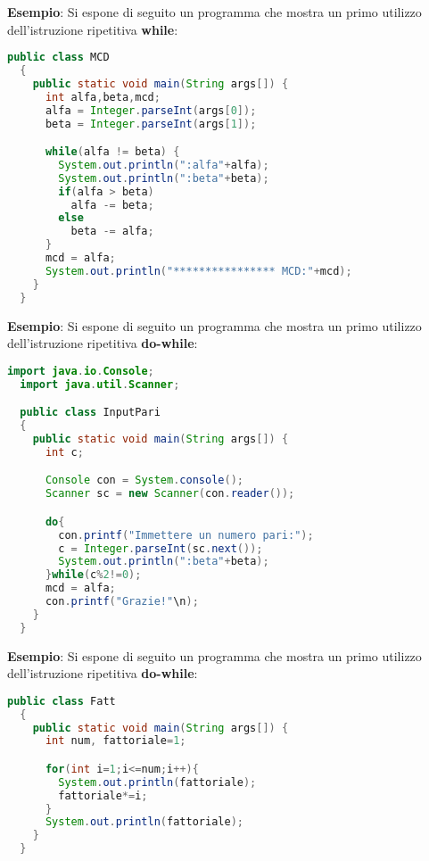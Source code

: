 \documentclass[a4paper]{extarticle}
\begin{document}
\vspace{0.5em}
\noindent
\textbf{Esempio}: Si espone di seguito un programma che mostra un primo utilizzo dell'istruzione ripetitiva \textbf{while}:

\vspace{1em}
\noindent
\begin{lstlisting}[language=Java, caption=Istruzione ripetitiva while in Java]
  public class MCD
  {
    public static void main(String args[]) {
      int alfa,beta,mcd;
      alfa = Integer.parseInt(args[0]);
      beta = Integer.parseInt(args[1]);

      while(alfa != beta) {
        System.out.println(":alfa"+alfa);
        System.out.println(":beta"+beta);
        if(alfa > beta)
          alfa -= beta;
        else
          beta -= alfa;
      }
      mcd = alfa;
      System.out.println("**************** MCD:"+mcd);
    }
  }
\end{lstlisting}

\vspace{1em}
\noindent
\textbf{Esempio}: Si espone di seguito un programma che mostra un primo utilizzo dell'istruzione ripetitiva \textbf{do-while}:

\vspace{1em}
\noindent
\begin{lstlisting}[language=Java, caption=Istruzione ripetitiva do-while in Java]
  import java.io.Console;
  import java.util.Scanner;

  public class InputPari
  {
    public static void main(String args[]) {
      int c;

      Console con = System.console();
      Scanner sc = new Scanner(con.reader());

      do{
        con.printf("Immettere un numero pari:");
        c = Integer.parseInt(sc.next());
        System.out.println(":beta"+beta);
      }while(c%2!=0);
      mcd = alfa;
      con.printf("Grazie!"\n);
    }
  }
\end{lstlisting}

\vspace{1em}
\noindent
\textbf{Esempio}: Si espone di seguito un programma che mostra un primo utilizzo dell'istruzione ripetitiva \textbf{do-while}:

\vspace{1em}
\noindent
\begin{lstlisting}[language=Java, caption=Istruzione ripetitiva for in Java]
  public class Fatt
  {
    public static void main(String args[]) {
      int num, fattoriale=1;

      for(int i=1;i<=num;i++){
        System.out.println(fattoriale);
        fattoriale*=i;
      }
      System.out.println(fattoriale);
    }
  }
\end{lstlisting}
\end{document}
